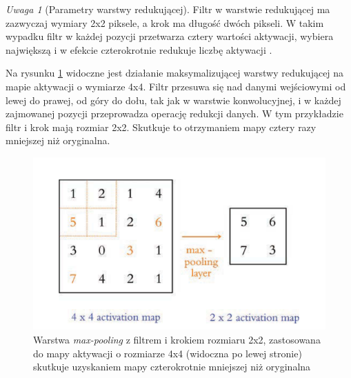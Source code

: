 \documentclass[12pt]{mwbk}
\theoremstyle{plain}
\theoremstyle{definition}
\theoremstyle{remark}
\newtheorem{uwaga}{Uwaga}[chapter]
\newcommand\zrodlo[1]{\par\vspace{-3mm}{\small\textit{Źródło: }#1 }}
\begin{document}
\begin{uwaga}[Parametry warstwy redukującej]
	 Filtr w warstwie redukującej ma zazwyczaj wymiary 2x2 piksele, a krok ma długość dwóch pikseli. W takim wypadku filtr w każdej pozycji przetwarza cztery wartości aktywacji, wybiera największą i w efekcie czterokrotnie redukuje liczbę aktywacji \cite{illustrated}.
\end{uwaga}

\newpage

Na rysunku \ref{fig:max-polling} widoczne jest działanie maksymalizującej warstwy redukującej na mapie aktywacji o wymiarze 4x4. Filtr przesuwa się nad danymi wejściowymi od lewej do prawej, od góry do dołu, tak jak w warstwie konwolucyjnej, i w każdej zajmowanej pozycji przeprowadza operację redukcji danych. W tym przykładzie filtr i krok mają rozmiar 2x2. Skutkuje to otrzymaniem mapy cztery razy mniejszej niż oryginalna.

\begin{figure}[!h]
	\centering
	\includegraphics[width=\linewidth]{rys/max-polling.png}
	\caption{Warstwa \emph{max-pooling} z filtrem i krokiem rozmiaru 2x2, zastosowana do mapy aktywacji o rozmiarze 4x4 (widoczna po lewej stronie) skutkuje uzyskaniem mapy czterokrotnie mniejszej niż oryginalna}
	\zrodlo{\cite{illustrated}}
	\label{fig:max-polling}
\end{figure}
\end{document}

